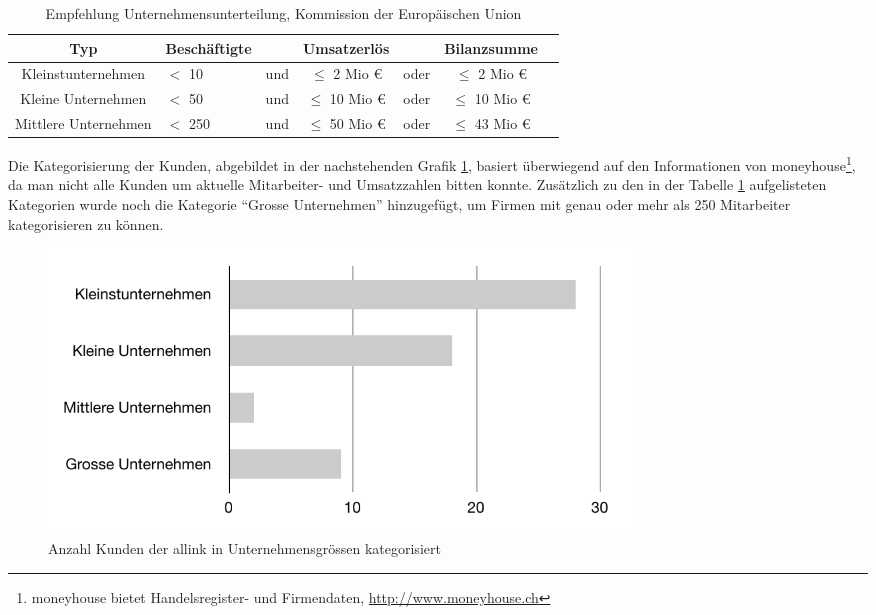 \begin{table}[h]
\begin{center}
    \begin{tabular}{clccccc}
        \toprule \textbf{Typ} & \textbf{Beschäftigte} & & \textbf{Umsatzerlös} & & \textbf{Bilanzsumme} \\
        \midrule Kleinstunternehmen & $<$ 10 & und & $\leq$ 2 Mio \euro & oder & $\leq$ 2 Mio \euro \\
        \midrule Kleine Unternehmen & $<$ 50 & und & $\leq$ 10 Mio \euro & oder & $\leq$ 10 Mio \euro \\
        \midrule Mittlere Unternehmen & $<$ 250 & und & $\leq$ 50 Mio \euro & oder & $\leq$ 43 Mio \euro \\
        \bottomrule
    \end{tabular}
    \caption[Empfehlung Unternehmensunterteilung, Kommission der Europäischen Union]{Empfehlung 
        Unternehmensunterteilung, Kommission der Europäischen Union\footnotemark}
    \label{tab:eu_unterteilung}
\end{center}
\end{table}

Die Kategorisierung der Kunden, abgebildet in der nachstehenden Grafik \ref{pic:kundenkategorisierung},
basiert überwiegend auf den Informationen von moneyhouse\footnote{moneyhouse bietet Handelsregister- und Firmendaten, \url{http://www.moneyhouse.ch}}, 
da man nicht alle Kunden um aktuelle Mitarbeiter- und Umsatzzahlen bitten konnte.
Zusätzlich zu den in der Tabelle \ref{tab:eu_unterteilung} aufgelisteten Kategorien 
wurde noch die Kategorie ``Grosse Unternehmen'' hinzugefügt, um Firmen mit genau 
oder mehr als 250 Mitarbeiter kategorisieren zu können.

\begin{figure}[htbp]
\begin{center}
\includegraphics[width=0.75\textwidth,angle=0]{./bilder/analyse/kundenkategorisierung.pdf}
\caption[Anzahl Kunden der allink in Unternehmensgrössen kategorisiert]{Anzahl 
    Kunden der allink in Unternehmensgrössen kategorisiert\footnotemark}
\label{pic:kundenkategorisierung}
\end{center}
\end{figure}

